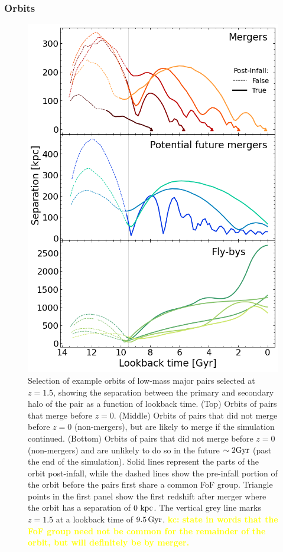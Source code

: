 \documentclass[twocolumn,linenumbers]{aastex631}
\newcommand{\kc}[1]{\textcolor{yellow}{\textbf{kc: #1}} }
\begin{document}
\subsubsection{Orbits} 
\begin{figure}[tb]
    \begin{center}
    \includegraphics[width=\columnwidth]{plots/bet-on-it/5_exampleorbits.png}
    \caption{Selection of example orbits of low-mass major pairs selected at $z=1.5$, showing the separation between the primary and secondary halo of the pair as a function of lookback time. 
    (Top) Orbits of pairs that merge before $z=0$.
    (Middle) Orbits of pairs that did not merge before $z=0$ (non-mergers), but are likely to merge if the simulation continued. 
    (Bottom) Orbits of pairs that did not merge before $z=0$ (non-mergers) and are unlikely to do so in the future $\sim2\mathrm{Gyr}$ (past the end of the simulation).
    Solid lines represent the parts of the orbit post-infall, while the dashed lines show the pre-infall portion of the orbit before the pairs first share a common FoF group. 
    Triangle points in the first panel show the first redshift after merger where the orbit has a separation of $0\,\mathrm{\,kpc}$.
    The vertical grey line marks $z=1.5$ at a lookback time of $9.5\,\mathrm{Gyr}$. \kc{state in words that the FoF group need not be common for the remainder of the orbit, but will definitely be by merger.}
    }
    \label{fig:example-orbits}
    \end{center}
\end{figure}
\end{document}

